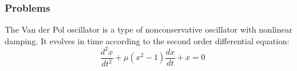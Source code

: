 \documentclass[14pt,compress]{beamer}
\newcounter{time}
\newcommand{\inctime}[1]{\addtocounter{time}{#1}{\tiny \thetime\ m}}
\begin{document}
\begin{frame}[fragile]
  \frametitle{Problems}
  The Van der Pol oscillator is a type of nonconservative oscillator with nonlinear damping. It evolves in time according to the second order differential equation:
  \begin{equation*}
  \frac{d^2x}{dt^2}+\mu(x^2-1)\frac{dx}{dt}+x= 0
  \end{equation*}
\inctime{25}
\end{frame}
\end{document}
